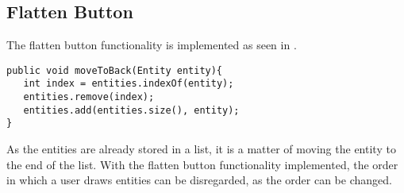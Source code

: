 \subsection{Flatten Button}
The flatten button functionality is implemented as seen in .

\begin{lstlisting}[label={lst:flatten}, caption={Flatten Button functionality}]
public void moveToBack(Entity entity){
   int index = entities.indexOf(entity);
   entities.remove(index);
   entities.add(entities.size(), entity);
}
\end{lstlisting}

As the entities are already stored in a list, it is a matter of moving the entity to the end of the list.
With the flatten button functionality implemented, the order in which a user draws entities can be disregarded, as the order can be changed.